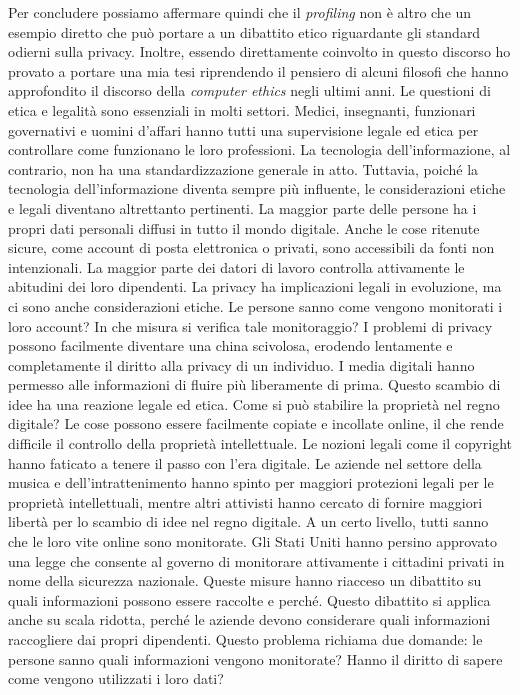 Per concludere possiamo affermare quindi che il \textit{profiling} non è altro che un esempio diretto che può portare a un dibattito etico riguardante gli standard odierni sulla privacy. Inoltre, essendo direttamente coinvolto in questo discorso ho provato a portare una mia tesi riprendendo il pensiero di alcuni filosofi che hanno approfondito il discorso della \textit{computer ethics} negli ultimi anni. Le questioni di etica e legalità sono essenziali in molti settori. 
Medici, insegnanti, funzionari governativi e uomini d'affari hanno tutti una supervisione legale ed etica per controllare come funzionano le loro professioni. La tecnologia dell'informazione, al contrario, non ha una standardizzazione generale in atto. Tuttavia, poiché la tecnologia dell'informazione diventa sempre più influente, le considerazioni etiche e legali diventano altrettanto pertinenti. La maggior parte delle persone ha i propri dati personali diffusi in tutto il mondo digitale. Anche le cose ritenute sicure, come account di posta elettronica o privati, sono accessibili da fonti non intenzionali. La maggior parte dei datori di lavoro controlla attivamente le abitudini dei loro dipendenti. La privacy ha implicazioni legali in evoluzione, ma ci sono anche considerazioni etiche. Le persone sanno come vengono monitorati i loro account? In che misura si verifica tale monitoraggio? I problemi di privacy possono facilmente diventare una china scivolosa, erodendo lentamente e completamente il diritto alla privacy di un individuo. 
I media digitali hanno permesso alle informazioni di fluire più liberamente di prima. Questo scambio di idee ha una reazione legale ed etica. Come si può stabilire la proprietà nel regno digitale? Le cose possono essere facilmente copiate e incollate online, il che rende difficile il controllo della proprietà intellettuale. Le nozioni legali come il copyright hanno faticato a tenere il passo con l'era digitale. Le aziende nel settore della musica e dell'intrattenimento hanno spinto per maggiori protezioni legali per le proprietà intellettuali, mentre altri attivisti hanno cercato di fornire maggiori libertà per lo scambio di idee nel regno digitale.
A un certo livello, tutti sanno che le loro vite online sono monitorate. Gli Stati Uniti hanno persino approvato una legge che consente al governo di monitorare attivamente i cittadini privati in nome della sicurezza nazionale. Queste misure hanno riacceso un dibattito su quali informazioni possono essere raccolte e perché. Questo dibattito si applica anche su scala ridotta, perché le aziende devono considerare quali informazioni raccogliere dai propri dipendenti. Questo problema richiama due domande: le persone sanno quali informazioni vengono monitorate? Hanno il diritto di sapere come vengono utilizzati i loro dati?
